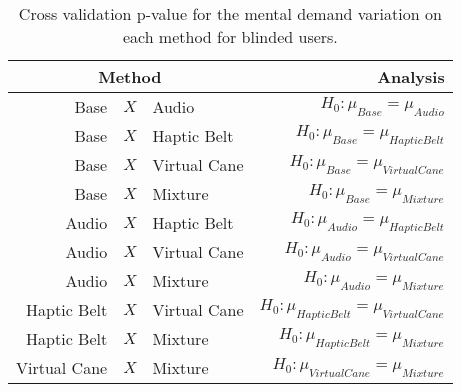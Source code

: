 
\begin{table}[!htb]
\centering
\caption{Cross validation p-value for the mental demand variation on each method for blinded users.}
\label{tab:lsdbloc_md_var_blind}
\begin{tabular}{rclr}
\toprule
      \multicolumn{3}{c}{Method} &                                       Analysis \\
\midrule
              Base & $X$ & Audio &               $H_0 : \mu_{Base} = \mu_{Audio}$ \\
        Base & $X$ & Haptic Belt &         $H_0 : \mu_{Base} = \mu_{Haptic Belt}$ \\
       Base & $X$ & Virtual Cane &        $H_0 : \mu_{Base} = \mu_{Virtual Cane}$ \\
            Base & $X$ & Mixture &             $H_0 : \mu_{Base} = \mu_{Mixture}$ \\
       Audio & $X$ & Haptic Belt &        $H_0 : \mu_{Audio} = \mu_{Haptic Belt}$ \\
      Audio & $X$ & Virtual Cane &       $H_0 : \mu_{Audio} = \mu_{Virtual Cane}$ \\
           Audio & $X$ & Mixture &            $H_0 : \mu_{Audio} = \mu_{Mixture}$ \\
Haptic Belt & $X$ & Virtual Cane & $H_0 : \mu_{Haptic Belt} = \mu_{Virtual Cane}$ \\
     Haptic Belt & $X$ & Mixture &      $H_0 : \mu_{Haptic Belt} = \mu_{Mixture}$ \\
    Virtual Cane & $X$ & Mixture &     $H_0 : \mu_{Virtual Cane} = \mu_{Mixture}$ \\
\bottomrule
\end{tabular}
\end{table}

